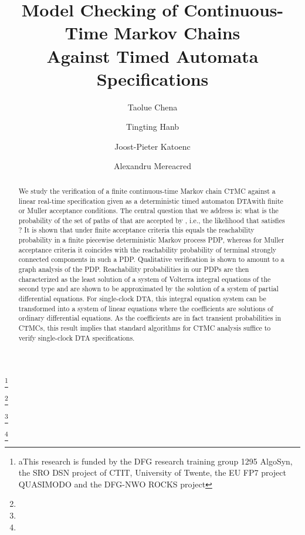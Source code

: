 \documentclass{LMCS}
\newcommand{\<}{\langle}
\renewcommand{\>}{\rangle}
\newcommand{\CTMC}{\textsc{{CTMC}}}
\newcommand{\DTA}{\textsc{DTA}}
\newcommand{\PDP}{\textsc{PDP}}
\begin{document}
\title[Model Checking of CTMCs Against Timed Automata]{Model Checking of Continuous-Time Markov Chains \\
Against Timed Automata Specifications}

\author[T.~Chen]{Taolue Chen\rsuper a} \address{{\lsuper a}Formal Methods and Tools,
University of Twente, The Netherlands}    \thanks{{\lsuper a}This research is funded by the DFG
research training group 1295 AlgoSyn, the SRO DSN project of CTIT, University of Twente, the EU FP7 project QUASIMODO
and the DFG-NWO ROCKS project}  

\author[T.~Han]{Tingting Han\rsuper b} \address{{}Software Modelling and
Verification, RWTH Aachen University, Germany
}    \thanks{}   

\author[J.-P.~Katoen]{Joost-Pieter Katoen\rsuper c}  \address{{\lsuper c}Software Modelling and
Verification, RWTH Aachen University, Germany;\newline Formal Methods and Tools, University of Twente, The Netherlands}      \thanks{}   

\author[A.~Mereacre]{Alexandru Mereacre\rsuper d}   \address{ pt}  \thanks{}


\begin{abstract}
\noindent
We study the verification of a finite continuous-time Markov chain \CTMC
 against a linear real-time specification given as a deterministic
timed automaton \DTA  with finite or Muller acceptance
conditions.
The central question that we address is: what is the probability of the set of
paths of  that are accepted by , i.e., the likelihood that
 satisfies ?
It is shown that under finite acceptance criteria this equals the reachability
probability in a finite piecewise deterministic Markov process \PDP, whereas
for Muller acceptance criteria it coincides with the reachability probability
of terminal strongly connected components in such a PDP.
Qualitative verification is shown to amount to a graph analysis of the PDP.
Reachability probabilities in our PDPs are then characterized as the least solution
of a system of Volterra integral equations of the second type and are shown
to be approximated by the solution of a system of partial differential equations.
For single-clock \DTA, this integral equation system can be transformed into
a system of linear equations where the coefficients are solutions of ordinary
differential equations.
As the coefficients are in fact transient probabilities in CTMCs, this result implies that
standard algorithms for CTMC analysis suffice to verify single-clock DTA specifications.
\end{abstract}
\end{document}
